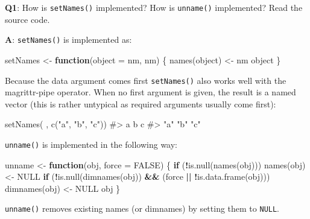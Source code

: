 \documentclass[
]{krantz}
\makeatletter
\newenvironment{Shaded}{\begin{snugshade}}{\end{snugshade}}
\newcommand{\CommentTok}[1]{\textcolor[rgb]{0.56,0.35,0.01}{\textit{#1}}}
\newcommand{\ControlFlowTok}[1]{\textcolor[rgb]{0.13,0.29,0.53}{\textbf{#1}}}
\newcommand{\DataTypeTok}[1]{\textcolor[rgb]{0.13,0.29,0.53}{#1}}
\newcommand{\KeywordTok}[1]{\textcolor[rgb]{0.13,0.29,0.53}{\textbf{#1}}}
\newcommand{\NormalTok}[1]{#1}
\newcommand{\OperatorTok}[1]{\textcolor[rgb]{0.81,0.36,0.00}{\textbf{#1}}}
\newcommand{\OtherTok}[1]{\textcolor[rgb]{0.56,0.35,0.01}{#1}}
\newcommand{\StringTok}[1]{\textcolor[rgb]{0.31,0.60,0.02}{#1}}
\newenvironment{kframe}{%
\medskip{}
\setlength{\fboxsep}{.8em}
 \def\at@end@of@kframe{}%
 \ifinner\ifhmode%
  \def\at@end@of@kframe{\end{minipage}}%
  \begin{minipage}{\columnwidth}%
 \fi\fi%
 \def\FrameCommand##1{\hskip\@totalleftmargin \hskip-\fboxsep
 \colorbox{shadecolor}{##1}\hskip-\fboxsep
     \hskip-\linewidth \hskip-\@totalleftmargin \hskip\columnwidth}%
 \MakeFramed {\advance\hsize-\width
   \@totalleftmargin\z@ \linewidth\hsize
   \@setminipage}}%
 {\par\unskip\endMakeFramed%
 \at@end@of@kframe}
\renewenvironment{Shaded}{\begin{kframe}}{\end{kframe}}
\renewcommand{\KeywordTok} [1]{\textcolor[rgb]{0.00,0.44,0.13}{{#1}}}
\renewcommand{\DataTypeTok}[1]{\textcolor[rgb]{0.56,0.13,0.00}{{#1}}}
\renewcommand{\StringTok}  [1]{\textcolor[rgb]{0.25,0.44,0.63}{{#1}}}
\renewcommand{\CommentTok} [1]{\textcolor[rgb]{0.38,0.63,0.69}{{#1}}}
\renewcommand{\OtherTok}   [1]{\textcolor[rgb]{0.00,0.44,0.13}{{#1}}}
\renewcommand{\NormalTok}  [1]{{#1}}
\makeatother
\begin{document}
\textbf{{Q1}}: How is \texttt{setNames()} implemented? How is \texttt{unname()} implemented? Read the source code.

\textbf{{A}}: \texttt{setNames()} is implemented as:

\begin{Shaded}
\begin{Highlighting}[]
\NormalTok{setNames <-}\StringTok{ }\ControlFlowTok{function}\NormalTok{(}\DataTypeTok{object =}\NormalTok{ nm, nm) \{}
  \KeywordTok{names}\NormalTok{(object) <-}\StringTok{ }\NormalTok{nm}
\NormalTok{  object}
\NormalTok{\}}
\end{Highlighting}
\end{Shaded}

Because the data argument comes first \texttt{setNames()} also works well with the magrittr-pipe operator. When no first argument is given, the result is a named vector (this is rather untypical as required arguments usually come first):

\begin{Shaded}
\begin{Highlighting}[]
\KeywordTok{setNames}\NormalTok{( , }\KeywordTok{c}\NormalTok{(}\StringTok{"a"}\NormalTok{, }\StringTok{"b"}\NormalTok{, }\StringTok{"c"}\NormalTok{))}
\CommentTok{#>   a   b   c }
\CommentTok{#> "a" "b" "c"}
\end{Highlighting}
\end{Shaded}

\texttt{unname()} is implemented in the following way:

\begin{Shaded}
\begin{Highlighting}[]
\NormalTok{unname <-}\StringTok{ }\ControlFlowTok{function}\NormalTok{(obj, }\DataTypeTok{force =} \OtherTok{FALSE}\NormalTok{) \{}
  \ControlFlowTok{if}\NormalTok{ (}\OperatorTok{!}\KeywordTok{is.null}\NormalTok{(}\KeywordTok{names}\NormalTok{(obj))) }
    \KeywordTok{names}\NormalTok{(obj) <-}\StringTok{ }\OtherTok{NULL}
  \ControlFlowTok{if}\NormalTok{ (}\OperatorTok{!}\KeywordTok{is.null}\NormalTok{(}\KeywordTok{dimnames}\NormalTok{(obj)) }\OperatorTok{&&}\StringTok{ }\NormalTok{(force }\OperatorTok{||}\StringTok{ }\OperatorTok{!}\KeywordTok{is.data.frame}\NormalTok{(obj))) }
    \KeywordTok{dimnames}\NormalTok{(obj) <-}\StringTok{ }\OtherTok{NULL}
\NormalTok{  obj}
\NormalTok{\}}
\end{Highlighting}
\end{Shaded}

\texttt{unname()} removes existing names (or dimnames) by setting them to \texttt{NULL}.
\end{document}
